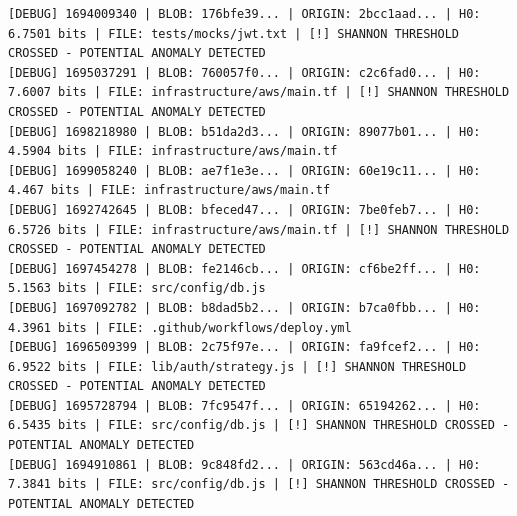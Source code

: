 \documentclass[12pt, a4paper, oneside]{report}
\begin{document}
\begin{lstlisting}[basicstyle=\tiny\ttfamily]
[DEBUG] 1694009340 | BLOB: 176bfe39... | ORIGIN: 2bcc1aad... | H0: 6.7501 bits | FILE: tests/mocks/jwt.txt | [!] SHANNON THRESHOLD CROSSED - POTENTIAL ANOMALY DETECTED
[DEBUG] 1695037291 | BLOB: 760057f0... | ORIGIN: c2c6fad0... | H0: 7.6007 bits | FILE: infrastructure/aws/main.tf | [!] SHANNON THRESHOLD CROSSED - POTENTIAL ANOMALY DETECTED
[DEBUG] 1698218980 | BLOB: b51da2d3... | ORIGIN: 89077b01... | H0: 4.5904 bits | FILE: infrastructure/aws/main.tf
[DEBUG] 1699058240 | BLOB: ae7f1e3e... | ORIGIN: 60e19c11... | H0: 4.467 bits | FILE: infrastructure/aws/main.tf
[DEBUG] 1692742645 | BLOB: bfeced47... | ORIGIN: 7be0feb7... | H0: 6.5726 bits | FILE: infrastructure/aws/main.tf | [!] SHANNON THRESHOLD CROSSED - POTENTIAL ANOMALY DETECTED
[DEBUG] 1697454278 | BLOB: fe2146cb... | ORIGIN: cf6be2ff... | H0: 5.1563 bits | FILE: src/config/db.js
[DEBUG] 1697092782 | BLOB: b8dad5b2... | ORIGIN: b7ca0fbb... | H0: 4.3961 bits | FILE: .github/workflows/deploy.yml
[DEBUG] 1696509399 | BLOB: 2c75f97e... | ORIGIN: fa9fcef2... | H0: 6.9522 bits | FILE: lib/auth/strategy.js | [!] SHANNON THRESHOLD CROSSED - POTENTIAL ANOMALY DETECTED
[DEBUG] 1695728794 | BLOB: 7fc9547f... | ORIGIN: 65194262... | H0: 6.5435 bits | FILE: src/config/db.js | [!] SHANNON THRESHOLD CROSSED - POTENTIAL ANOMALY DETECTED
[DEBUG] 1694910861 | BLOB: 9c848fd2... | ORIGIN: 563cd46a... | H0: 7.3841 bits | FILE: src/config/db.js | [!] SHANNON THRESHOLD CROSSED - POTENTIAL ANOMALY DETECTED
\end{lstlisting}
\end{document}
